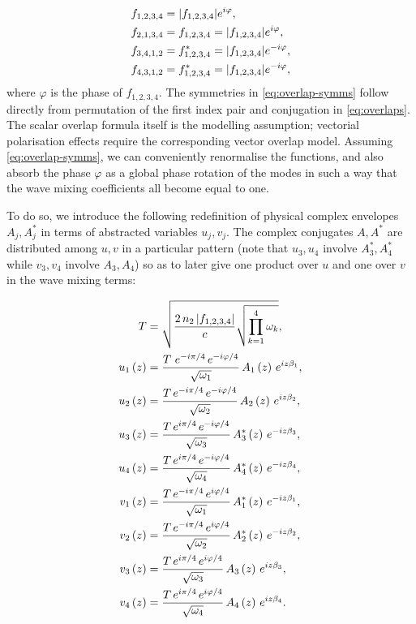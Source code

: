 \documentclass[11pt,a4paper]{article}
\numberwithin{equation}{section}
\begin{document}
\begin{align}
f_{1,2,3,4} &= |f_{1,2,3,4}|e^{i\varphi}, \notag \\
f_{2,1,3,4} &= f_{1,2,3,4} = |f_{1,2,3,4}|e^{i\varphi}, \notag \\
f_{3,4,1,2} &= f_{1,2,3,4}^* = |f_{1,2,3,4}|e^{-i\varphi}, \notag \\
f_{4,3,1,2} &= f_{1,2,3,4}^* = |f_{1,2,3,4}|e^{-i\varphi}, \label{eq:overlap-symms}
\end{align}
where $\varphi$ is the phase of $f_{1,2,3,4}$.
The symmetries in \eqref{eq:overlap-symms} follow directly from permutation of the first index pair and conjugation in \eqref{eq:overlaps}.
The scalar overlap formula itself is the modelling assumption; vectorial polarisation effects require the corresponding vector overlap model.
Assuming \eqref{eq:overlap-symms}, we can conveniently renormalise the functions, and also absorb the phase $\varphi$ as a global phase rotation of the modes in such a way that the wave mixing coefficients all become equal to one.

To do so, we introduce the following redefinition of physical complex envelopes $A_j, A^*_j$ in terms of abstracted variables $u_j,v_j$.
The complex conjugates $A, A^*$ are distributed among $u,v$ in a particular pattern (note that $u_3, u_4$ involve $A^*_3, A^*_4$ while $v_3, v_4$ involve $A_3, A_4$) so as to later give one product over $u$ and one over $v$ in the wave mixing terms:

\begin{align}
T &= \sqrt{\frac{2\,n_2 \left|f_{1,2,3,4}\right|}{c} \sqrt{ \prod\limits_{k=1}^{4} \omega_k}}, \label{eq:T-def} \\
u_1\left(z\right) &= \frac{T\,\,e^{-i\pi/4}\,e^{-i\varphi/4}}{\sqrt{\omega_{1}}} \,A_{1}\left(z\right)\,e^{i z \beta_{1}}, \notag \\
u_2\left(z\right) &= \frac{T\,e^{-i\pi/4}\,e^{-i\varphi/4}}{\sqrt{\omega_{2}}}\,A_{2}\left(z\right)\,e^{i z \beta_{2}}, \notag \\
u_3\left(z\right) &= \frac{T\,e^{i\pi/4}\,e^{-i\varphi/4}}{\sqrt{\omega_{3}}}\,A^*_{3}\left(z\right)\,e^{-i z \beta_{3}}, \notag \\
u_4\left(z\right) &= \frac{T\,e^{i\pi/4}\,e^{-i\varphi/4}}{\sqrt{\omega_{4}}}\,A^*_{4}\left(z\right)\,e^{-i z \beta_{4}}, \notag \\
v_1\left(z\right) &= \frac{T\,e^{-i\pi/4}\,e^{i\varphi/4}}{\sqrt{\omega_{1}}}\,A^*_{1}\left(z\right)\,e^{-i z \beta_{1}}, \notag \\
v_2\left(z\right) &= \frac{T\,e^{-i\pi/4}\,e^{i\varphi/4}}{\sqrt{\omega_{2}}}\,A^*_{2}\left(z\right)\,e^{-i z \beta_{2}}, \notag \\
v_3\left(z\right) &= \frac{T\,e^{i\pi/4}\,e^{i\varphi/4}}{\sqrt{\omega_{3}}}\,A_{3}\left(z\right)\,e^{i z \beta_{3}}, \notag \\
v_4\left(z\right) &= \frac{T\,e^{i\pi/4}\,e^{i\varphi/4}}{\sqrt{\omega_{4}}}\,A_{4}\left(z\right)\,e^{i z \beta_{4}}. \label{eq:u-v-A}
\end{align}
\end{document}

